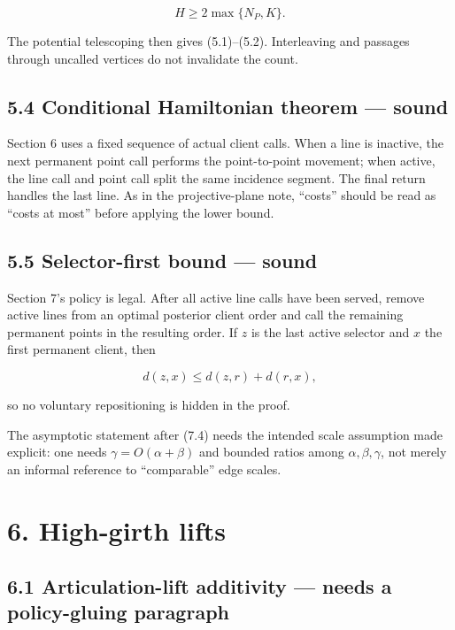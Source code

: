 \documentclass[11pt,a4paper]{article}
\begin{document}
\[
 H\ge2\max\{N_P,K\}.
\]

The potential telescoping then gives (5.1)–(5.2).  Interleaving and passages through uncalled vertices do not invalidate the count.


\subsection*{5.4 Conditional Hamiltonian theorem — sound}

Section 6 uses a fixed sequence of actual client calls.  When a line is inactive, the next permanent point call performs the point-to-point movement; when active, the line call and point call split the same incidence segment. The final return handles the last line.  As in the projective-plane note, “costs” should be read as “costs at most” before applying the lower bound.


\subsection*{5.5 Selector-first bound — sound}

Section 7's policy is legal.  After all active line calls have been served, remove active lines from an optimal posterior client order and call the remaining permanent points in the resulting order.  If \(z\) is the last active selector and \(x\) the first permanent client, then


\[
 d(z,x)\le d(z,r)+d(r,x),
\]

so no voluntary repositioning is hidden in the proof.


The asymptotic statement after (7.4) needs the intended scale assumption made explicit: one needs \(\gamma=O(\alpha+\beta)\) and bounded ratios among \(\alpha,\beta,\gamma\), not merely an informal reference to “comparable” edge scales.


\section*{6. High-girth lifts}

\subsection*{6.1 Articulation-lift additivity — needs a policy-gluing paragraph}
\end{document}
